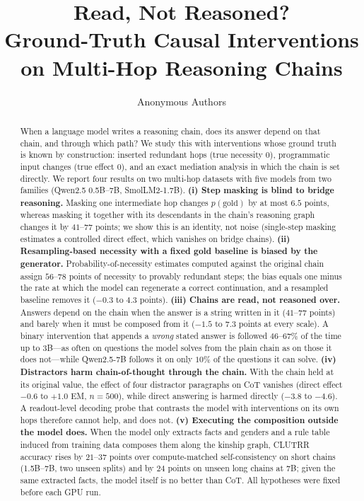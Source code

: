 \documentclass[11pt]{article}
\title{Read, Not Reasoned?\\ Ground-Truth Causal Interventions on Multi-Hop Reasoning Chains}
\author{Anonymous Authors}
\date{}
\begin{document}
\maketitle

\begin{abstract}
When a language model writes a reasoning chain, does its answer depend on that chain, and through
which path? We study this with interventions whose ground truth is known by construction:
inserted redundant hops (true necessity $0$), programmatic input changes (true effect $0$), and an
exact mediation analysis in which the chain is set directly. We report four results on two
multi-hop datasets with five models from two families (Qwen2.5 0.5B--7B, SmolLM2-1.7B).
\textbf{(i) Step masking is blind to bridge reasoning.} Masking one intermediate hop changes
$p(\text{gold})$ by at most $6.5$ points, whereas masking it together with its descendants in the
chain's reasoning graph changes it by $41$--$77$ points; we show this is an identity, not noise
(single-step masking estimates a controlled direct effect, which vanishes on bridge chains).
\textbf{(ii) Resampling-based necessity with a fixed gold baseline is biased by the generator.}
Probability-of-necessity estimates computed against the original chain assign $56$--$78$ points of
necessity to provably redundant steps; the bias equals one minus the rate at which the model can
regenerate a correct continuation, and a resampled baseline removes it ($-0.3$ to $4.3$ points).
\textbf{(iii) Chains are read, not reasoned over.} Answers depend on the chain when the answer is a
string written in it ($41$--$77$ points) and barely when it must be composed from it ($-1.5$ to
$7.3$ points at every scale). A binary intervention that appends a \emph{wrong} stated
answer is followed $46$--$67\%$ of the time up to 3B---as often on questions the model solves from
the plain chain as on those it does not---while Qwen2.5-7B follows it on only $10\%$ of the
questions it can solve. \textbf{(iv) Distractors harm chain-of-thought through the chain.} With
the chain held at its original value, the effect of four distractor paragraphs on CoT vanishes
(direct effect $-0.6$ to $+1.0$ EM, $n{=}500$), while direct answering is harmed directly ($-3.8$ to
$-4.6$). A readout-level decoding probe that contrasts the model with interventions on its own hops
therefore cannot help, and does not. \textbf{(v) Executing the composition outside the model does.}
When the model only extracts facts and genders and a rule table induced from training data composes
them along the kinship graph, CLUTRR accuracy rises by $21$--$37$ points over compute-matched
self-consistency on short chains (1.5B--7B, two unseen splits) and by $24$ points on unseen long
chains at 7B; given the same extracted facts, the model itself is no better than CoT. All hypotheses
were fixed before each GPU run.
\end{abstract}
\end{document}
